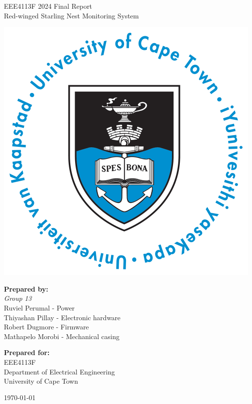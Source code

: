 \thispagestyle{empty}
\begin{center}
    
\Huge

\vspace{5cm}

EEE4113F 2024 Final Report \\
Red-winged Starling Nest Monitoring System

\vspace{2.5cm}

\includegraphics[width=0.4\linewidth]{FrontMatter/UCT_logo.png}

\vfill

\large
\textbf{Prepared by:}\\
\textit{Group 13} \\
Ruviel Perumal - Power\\
Thiyashan Pillay - Electronic hardware \\
Robert Dugmore - Firmware\\
Mathapelo Morobi - Mechanical casing\\




\vspace{1cm}

\textbf{Prepared for:}\\
EEE4113F\\
Department of Electrical Engineering\\
University of Cape Town

\vspace{2cm}

\today


\end{center}
